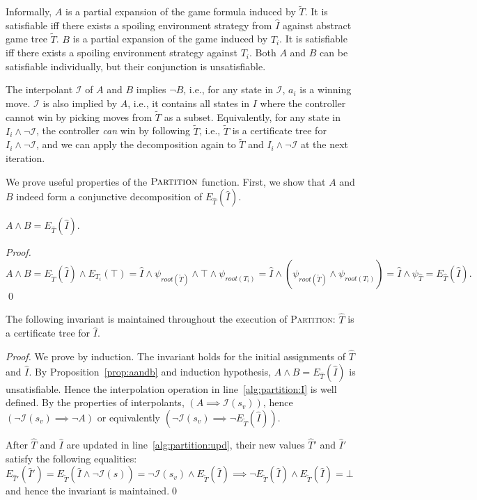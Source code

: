 Informally, $A$ is a partial expansion of the game formula induced by
$\tilde{T}$.  It is satisfiable iff there exists a spoiling environment
strategy from $\hat{I}$ against abstract game tree $\tilde{T}$.
$B$ is a partial expansion of the game induced by $T_i$.  It is satisfiable
iff there exists a spoiling environment strategy against $T_i$.
Both $A$ and $B$ can be satisfiable individually, but their conjunction
is unsatisfiable.

The interpolant $\mathcal{I}$ of $A$ and $B$
implies $\neg B$, i.e., for any state in $\mathcal{I}$, $a_i$ is a winning move.
$\mathcal{I}$ is also implied by $A$, i.e., it contains all states in $I$ where
the controller cannot win by picking moves from $\tilde{T}$ as a subset.
Equivalently, for any state in $I_i \land \neg \mathcal{I}$, the controller \emph{can}
win by following $\tilde{T}$, i.e., $\tilde{T}$ is a certificate tree for
$I_i \land \neg \mathcal{I}$, and we can apply the decomposition
again to $\tilde{T}$ and $I_i \land \neg \mathcal{I}$
at the next iteration.

We prove useful properties of the $\textsc{Partition}$ function.  First, we show that $A$ and
$B$ indeed form a conjunctive decomposition of $E_{\hat{T}}(\hat{I})$.
\begin{proposition}\label{prop:aandb}
    $A\land B = E_{\hat{T}}(\hat{I})$.
\end{proposition}
\begin{proof}
$A\land B = E_{\tilde{T}}(\hat{I}) \land E_{T_i}(\top) =
\hat{I} \land \psi_{root(\tilde{T})} \land \top \land \psi_{root(T_i)} =
\hat{I} \land (\psi_{root(\tilde{T})}\! \land\! \psi_{root(T_i)}) =
\hat{I}\! \land\! \psi_{\hat{T}} = E_{\hat{T}}(\hat{I}).$
\qed
\end{proof}

\begin{proposition}
    The following invariant is maintained throughout the execution of
    \textsc{Partition}: $\hat{T}$ is a certificate tree for $\hat{I}$.
\end{proposition}
\begin{proof}
We prove by induction.  The invariant holds for the initial
assignments of $\hat{T}$ and $\hat{I}$.
By Proposition~\ref{prop:aandb} and induction hypothesis, $A\land B =
E_{\hat{T}}(\hat{I})$ is unsatisfiable.  Hence the interpolation
operation in line~\ref{alg:partition:I} is well defined.  By the
properties of interpolants, $(A\implies\mathcal{I}(s_v))$, hence
$(\neg\mathcal{I}(s_v) \implies \neg A)$ or equivalently
$(\neg\mathcal{I}(s_v) \implies \neg E_{\tilde{T}}(\hat{I}))$.

After $\hat{T}$ and $\hat{I}$ are updated in
line~\ref{alg:partition:upd}, their new values $\hat{T}'$ and
$\hat{I}'$ satisfy the following equalities:
$E_{\hat{T}'}(\hat{I}') = E_{\tilde{T}}(\hat{I} \land
\neg\mathcal{I}(s)) = \neg\mathcal{I}(s_v) \land
E_{\tilde{T}}(\hat{I}) \implies \neg E_{\tilde{T}}(\hat{I}) \land
E_{\tilde{T}}(\hat{I}) = \bot$ and hence the invariant is
maintained.\qed
\end{proof}

